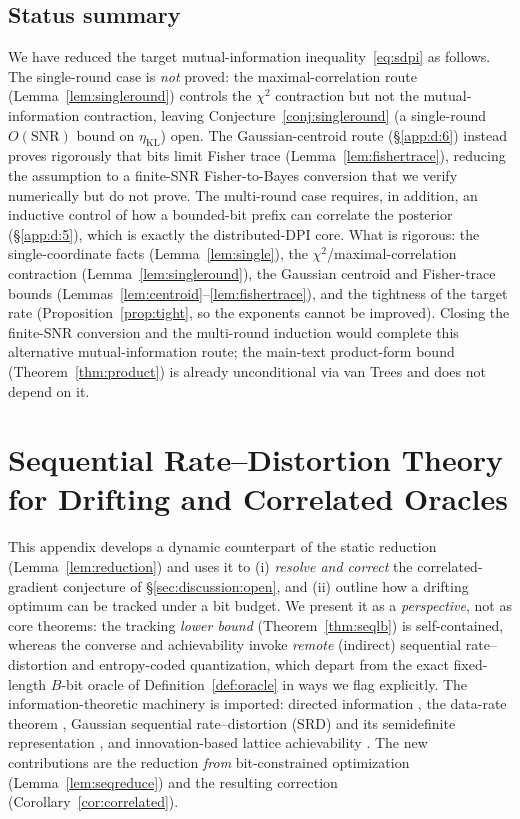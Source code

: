 \documentclass[11pt]{article}
\theoremstyle{definition}
\begin{document}
\subsection{Status summary}\label{app:d:7}

We have reduced the target mutual-information inequality~\eqref{eq:sdpi} as follows. The single-round case is \emph{not} proved: the
maximal-correlation route (Lemma~\ref{lem:singleround}) controls the $\chi^2$ contraction but not the
mutual-information contraction, leaving Conjecture~\ref{conj:singleround} (a single-round
$O(\mathrm{SNR})$ bound on $\eta_{\mathrm{KL}}$) open. The Gaussian-centroid route (\S\ref{app:d:6}) instead proves
rigorously that bits limit Fisher trace (Lemma~\ref{lem:fishertrace}), reducing the assumption to a
finite-SNR Fisher-to-Bayes conversion that we verify numerically but do not prove. The multi-round case
requires, in addition, an inductive control of how a bounded-bit prefix can correlate the posterior
(\S\ref{app:d:5}), which is exactly the distributed-DPI core. What is rigorous: the single-coordinate facts
(Lemma~\ref{lem:single}), the $\chi^2$/maximal-correlation contraction (Lemma~\ref{lem:singleround}), the
Gaussian centroid and Fisher-trace bounds (Lemmas~\ref{lem:centroid}--\ref{lem:fishertrace}), and the
tightness of the target rate (Proposition~\ref{prop:tight}, so the exponents cannot be improved). Closing
the finite-SNR conversion and the multi-round induction would complete this alternative
mutual-information route; the main-text product-form bound (Theorem~\ref{thm:product}) is already
unconditional via van Trees and does not depend on it.

\section{Sequential Rate--Distortion Theory for Drifting and Correlated Oracles}
\label{app:seqrd}

This appendix develops a dynamic counterpart of the static reduction (Lemma~\ref{lem:reduction}) and uses
it to (i) \emph{resolve and correct} the correlated-gradient conjecture of \S\ref{sec:discussion:open},
and (ii) outline how a drifting optimum can be tracked under a bit budget. We present it as a
\emph{perspective}, not as core theorems: the tracking \emph{lower bound}
(Theorem~\ref{thm:seqlb}) is self-contained, whereas the converse and achievability invoke
\emph{remote} (indirect) sequential rate--distortion and entropy-coded quantization, which depart from
the exact fixed-length $B$-bit oracle of Definition~\ref{def:oracle} in ways we flag explicitly. The
information-theoretic machinery is imported: directed information \citep{massey1990directed}, the
data-rate theorem \citep{nair2004stabilizability}, Gaussian sequential rate--distortion (SRD) and its
semidefinite representation \citep{tatikonda2009capacity,tanaka2017sdp,stavrou2020revisited}, and
innovation-based lattice achievability \citep{kostina2019ratecost,zamir1998nested}. The new
contributions are the reduction \emph{from} bit-constrained optimization (Lemma~\ref{lem:seqreduce}) and
the resulting correction (Corollary~\ref{cor:correlated}).
\end{document}
